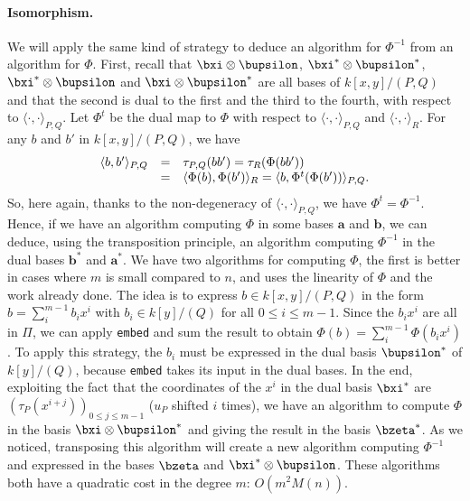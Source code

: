 \documentclass[a4paper,11pt]{article}
\theoremstyle{break}
\theoremstyle{definition}
\theoremstyle{remark}
\newcommand{\ps}[2]{\langle#1,#2\rangle}
\newcommand{\psdot}{\ps{\cdot}{\cdot}}
\begin{document}
\paragraph{Isomorphism.} We will apply the same kind of strategy to deduce an 
algorithm for $\Phi^{-1}$ from an algorithm for $\Phi$. First, recall that 
$\bxi\otimes\bupsilon$, $\bxi^*\otimes\bupsilon^*$, $\bxi^*\otimes\bupsilon$ 
and $\bxi\otimes\bupsilon^*$ are all bases of $k[x,y]/(P,Q)$ and that the 
second is dual to the first and the third to the fourth, with respect to 
$\psdot_{P,Q}$. Let $\Phi^t$ be the dual map to $\Phi$ with respect to 
$\psdot_{P,Q}$ and $\psdot_R$. For any $b$ and $b'$ in $k[x,y]/(P,Q)$, we have
\[
\begin{array}[here]{rcl}
  \ps{b}{b'}_{P,Q} &=& \tau_{P,Q}(bb') = \tau_R(\Phi(bb')) \\
  &=& \ps{\Phi(b)}{\Phi(b')}_R = \ps{b}{\Phi^t(\Phi(b'))}_{P,Q}.
\end{array}
\]
So, here again, thanks to the non-degeneracy of $\psdot_{P,Q}$, we have 
$\Phi^t=\Phi^{-1}$. Hence, if we have an algorithm computing $\Phi$ in  
some bases $\textbf{a}$ and $\textbf{b}$, we can deduce, using the 
transposition principle, an algorithm computing $\Phi^{-1}$ in the dual bases 
$\textbf{b}^*$ and $\textbf{a}^*$. We have two algorithms for computing $\Phi$, 
the first is better in cases where $m$ is small compared to $n$, and uses the 
linearity of $\Phi$ and the work already done. The idea is to express $b\in 
k[x,y]/(P,Q)$ in the form $b=\sum_i^{m-1}b_ix^i$ with $b_i\in k[y]/(Q)$ for all 
$0\leq i \leq m-1$. Since the $b_ix^i$ are all in $\Pi$, we can apply 
\texttt{embed} and sum the result to obtain $\Phi(b)=\sum_i^{m-1}\Phi(b_ix^i)$. 
To apply this strategy, the $b_i$ must be expressed in the dual basis 
$\bupsilon^*$ of $k[y]/(Q)$, because \texttt{embed} takes its input in the dual 
bases. In the end, exploiting the fact that the coordinates of the $x^i$ in the 
dual basis $\bxi^*$ are $(\tau_P(x^{i+j}))_{0\leq j\leq m-1}$ ($u_P$ shifted 
$i$ times), we have an algorithm to compute $\Phi$ in the basis 
$\bxi\otimes\bupsilon^*$ and giving the result in the basis $\bzeta^*$. As we 
noticed, transposing this algorithm will create a new algorithm computing 
$\Phi^{-1}$ and expressed in the bases $\bzeta$ and $\bxi^*\otimes\bupsilon$. 
These algorithms both have a quadratic cost in the degree $m$: $O(m^2M(n))$.
\end{document}
